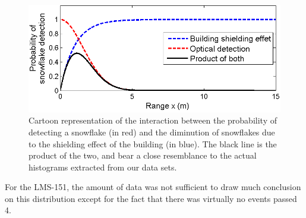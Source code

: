 \begin{figure}[th]
    \centering
    \includegraphics[width=0.97\linewidth]{./img/ShieldingModel.png}
    \caption{Cartoon representation of the interaction between the probability of detecting a snowflake (in red) and the diminution of snowflakes due to the shielding effect of the building (in blue). The black line is the product of the two, and bear a close resemblance to the actual histograms extracted from our data sets.}
    \label{fig:CartoonModel}
\end{figure}

For the LMS-151, the amount of data was not sufficient to draw much conclusion on this distribution except for the fact that there was virtually no events passed 4.


